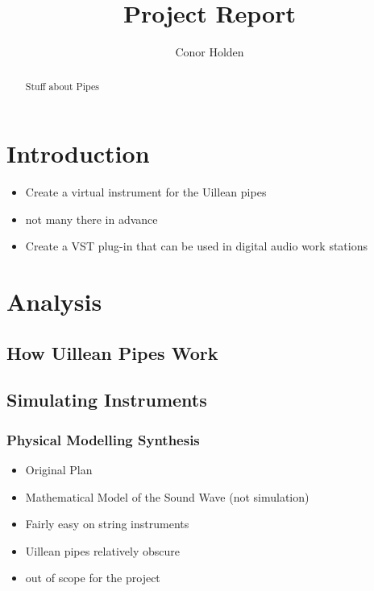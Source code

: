 \documentclass[12pt]{article}
\title{Project Report}
\author{Conor Holden }
\begin{document}
	
	\maketitle
	
	\begin{abstract}
	Stuff about Pipes
	
		
	\end{abstract}

	
	
	
	\tableofcontents
	
	
\section{Introduction}
	
	\begin{itemize}
		\item Create a virtual instrument for the Uillean pipes
		\item not many there in advance
		\item Create a VST plug-in that can be used in digital audio work stations
	\end{itemize}
	
	
\section{Analysis}
	
	
	\subsection{How Uillean Pipes Work}	
	
	
	\subsection{ Simulating Instruments }
	
	\subsubsection{Physical Modelling Synthesis}
	\begin{itemize}
		\item Original Plan
		\item Mathematical Model of the Sound Wave (not simulation)
		\item Fairly easy on string instruments
		\item Uillean pipes relatively obscure
		\item out of scope for the project
	\end{itemize}
\end{document}
